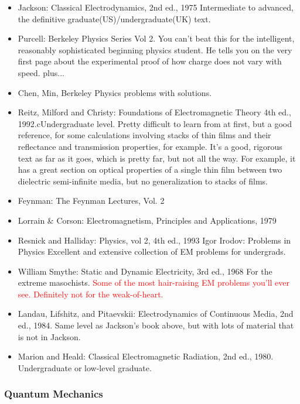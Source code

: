 \documentclass[10pt,a4paper]{book}
\theoremstyle{definition}
\begin{document}
\begin{itemize}
\item Jackson: Classical Electrodynamics, 2nd ed., 1975
Intermediate to advanced, the definitive graduate(US)/undergraduate(UK) text.

\item Purcell: Berkeley Physics Series Vol 2.
You can't beat this for the intelligent, reasonably sophisticated beginning physics student.  He tells you on the very first page about the experimental proof of how charge does not vary with speed.
plus... 
\item Chen, Min, Berkeley Physics problems with solutions.
\item Reitz, Milford and Christy: Foundations of Electromagnetic Theory 4th ed., 1992.cUndergraduate level. Pretty difficult to learn from at first, but a good reference, for some calculations involving stacks of thin films and their reflectance and transmission properties, for example.  It's a good, rigorous text as far as it goes, which is pretty far, but not all the way.  For example, it has a great section on optical properties of a single thin film between two dielectric semi-infinite media, but no generalization to stacks of films.

\item Feynman: The Feynman Lectures, Vol. 2
\item Lorrain \& Corson: Electromagnetism, Principles and Applications, 1979
\item Resnick and Halliday: Physics, vol 2, 4th ed., 1993
Igor Irodov: Problems in Physics Excellent and extensive collection of EM problems for undergrads.
\item William Smythe: Static and Dynamic Electricity, 3rd ed., 1968
For the extreme masochists.  \textcolor{red}{Some of the most hair-raising EM problems you'll ever see.  Definitely not for the weak-of-heart.}
\item Landau, Lifshitz, and Pitaevskii: Electrodynamics of Continuous Media, 2nd ed., 1984. Same level as Jackson's book above, but with lots of material that is not in Jackson.
\item Marion and Heald: Classical Electromagnetic Radiation, 2nd ed., 1980. Undergraduate or low-level graduate.
\end{itemize}


\subsubsection{Quantum Mechanics}
\end{document}
